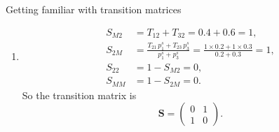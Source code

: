 \documentclass[12pt]{article}
\begin{document}
\begin{problem}{Getting familiar with transition matrices}
\begin{enumerate}
  \item
    $$
    \begin{aligned}
      S_{M2} &= T_{12} + T_{32} = 0.4 + 0.6 = 1, \\
      S_{2M} &= \frac{ T_{21} \, p^s_1 + T_{23} \, p^s_3 } { p^s_1 + p^s_3 }
              = \frac{ 1 \times 0.2 + 1 \times 0.3 } { 0.2 + 0.3 } = 1, \\
      S_{22} &= 1 - S_{M2} = 0, \\
      S_{MM} &= 1 - S_{2M} = 0.
    \end{aligned}
    $$
    So the transition matrix is
    $$
    \mathbf S
    = \left(
      \begin{array}{ccc}
      0 & 1 \\
      1 & 0
      \end{array}
    \right)
    .
    $$
\end{enumerate}
\end{problem}
\end{document}
